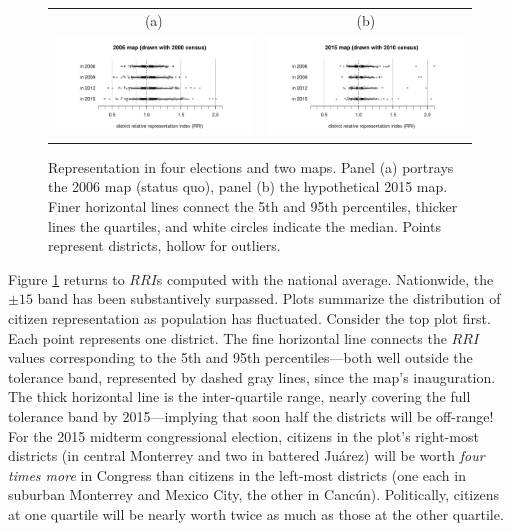 \documentclass[letter,12pt]{article}
\begin{document}
\begin{figure}
\begin{center}
\begin{tabular}{cc}
    (a)&(b)\\
    \includegraphics[width=.5\columnwidth]{rrin0615d0.pdf}&\includegraphics[width=.5\columnwidth]{rrin0615d3.pdf}
\end{tabular}
\caption{Representation in four elections and two maps. Panel (a) portrays the 2006 map (status quo), panel (b) the hypothetical 2015 map. Finer horizontal lines connect the 5th and 95th percentiles, thicker lines the quartiles, and white circles indicate the median. Points represent districts, hollow for outliers.}\label{F:malapp}
\end{center}
\end{figure}

Figure \ref{F:malapp} returns to $RRI$s computed with the national average. Nationwide, the $\pm15$ band has been substantively surpassed. Plots summarize the distribution of citizen representation as population has fluctuated. Consider the top plot first. Each point represents one district. The fine horizontal line connects the $RRI$ values corresponding to the 5th and 95th percentiles---both well outside the tolerance band, represented by dashed gray lines, since the map's inauguration. The thick horizontal line is the inter-quartile range, nearly covering the full tolerance band by 2015---implying that soon half the districts will be off-range! For the 2015 midterm congressional election, citizens in the plot's right-most districts (in central Monterrey and two in battered Ju\'arez) will be worth \emph{four times more} in Congress than citizens in the left-most districts (one each in suburban Monterrey and Mexico City, the other in Canc\'un). Politically, citizens at one quartile will be nearly worth twice as much as those at the other quartile. 
\end{document}
